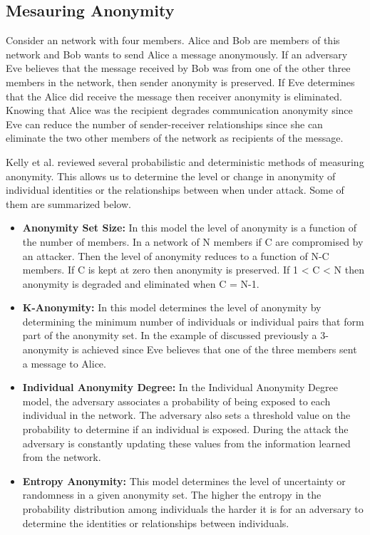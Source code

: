 \documentclass{llncs}
\begin{document}
\subsection{Mesauring Anonymity}
Consider an network with four members. Alice and Bob are members of this network and Bob wants to send Alice a message anonymously. If an adversary Eve believes that the message received by Bob was from one of the other three members in the network, then sender anonymity is preserved. If Eve determines that the Alice did receive the message then receiver anonymity is eliminated. Knowing that Alice was the recipient degrades communication anonymity since Eve can reduce the number of sender-receiver relationships since she can eliminate the two other members of the network as recipients of the message.

Kelly et al. \cite{kelly2012exploring} reviewed several probabilistic and deterministic methods of measuring anonymity. This allows us to determine the level or change in anonymity of individual identities or the relationships between when under attack. Some of them are summarized below. 
\begin{itemize}
	\item[]{\textbf{Anonymity Set Size:} In this model the level of anonymity is a function of the number of members. In a network of N members if C are compromised by an attacker. Then the level of anonymity reduces to a function of N-C members. If C is kept at zero then anonymity is preserved. If 1 < C < N then anonymity is degraded and eliminated when C = N-1.}
	\item[]{\textbf{K-Anonymity:} In this model determines the level of anonymity by determining the minimum number of individuals or individual pairs that form part of the anonymity set. In the example of discussed previously a 3-anonymity is achieved since Eve believes that one of the three members sent a message to Alice.}
	\item[]{\textbf{Individual Anonymity Degree:} In the Individual Anonymity Degree model, the adversary associates a probability of being exposed to each individual in the network. The adversary also sets a threshold value on the probability to determine if an individual is exposed. During the attack the adversary is constantly updating these values from the information learned from the network.}
	\item[]{\textbf{Entropy Anonymity:} This model determines the level of uncertainty or randomness in a given anonymity set. The higher the entropy in the probability distribution among individuals the harder it is for an adversary to determine the identities or relationships between individuals.}
\end{itemize}
\end{document}
